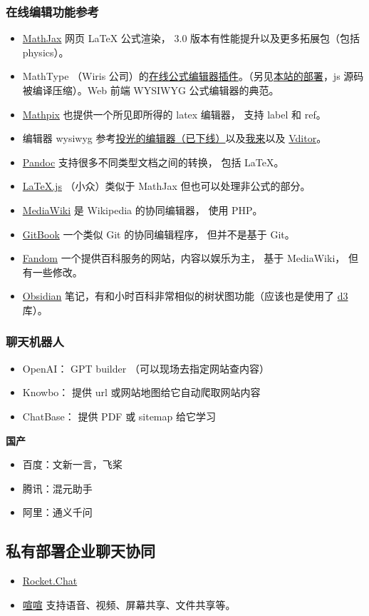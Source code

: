 \subsubsection{在线编辑功能参考}
\begin{itemize}
\item \href{https://www.mathjax.org}{MathJax} 网页 LaTeX 公式渲染， 3.0 版本有性能提升以及更多拓展包（包括 physics）。
\item MathType （Wiris 公司）的\href{https://demo.wiris.com/mathtype/en/developers.php}{在线公式编辑器插件}。（另见\href{https://wuli.wiki/apps/mathtype.html}{本站的部署}，js 源码被编译压缩）。Web 前端 WYSIWYG 公式编辑器的典范。
\item \href{https://mathpix.com/ocr?gclid=CjwKCAiAy_CcBhBeEiwAcoMRHKnSPGjROmFGBj5R_Ev3hke7lG7xNIzKDHv5FgkMFq62aXRpISt_LhoC47YQAvD_BwE}{Mathpix} 也提供一个所见即所得的 latex 编辑器， 支持 label 和 ref。
\item 编辑器 wysiwyg 参考\href{https://editoe.com}{投光的编辑器（已下线）}以及\href{https://www.wolai.com}{我来}以及 \href{https://github.com/Vanessa219/vditor}{Vditor}。
\item \href{https://pandoc.org/}{Pandoc} 支持很多不同类型文档之间的转换， 包括 LaTeX。
\item \href{https://github.com/michael-brade/LaTeX.js}{LaTeX.js} （小众）类似于 MathJax 但也可以处理非公式的部分。
\item \href{https://www.mediawiki.org/wiki/MediaWiki}{MediaWiki} 是 Wikipedia 的协同编辑器， 使用 PHP。
\item \href{https://www.gitbook.com/}{GitBook} 一个类似 Git 的协同编辑程序， 但并不是基于 Git。
\item \href{https://www.fandom.com/}{Fandom} 一个提供百科服务的网站，内容以娱乐为主， 基于 MediaWiki， 但有一些修改。
\item \href{https://obsidian.md/}{Obsidian} 笔记，有和小时百科非常相似的树状图功能（应该也是使用了 \href{https://d3js.org/}{d3} 库）。
\end{itemize}

\subsubsection{聊天机器人}
\begin{itemize}
\item OpenAI： GPT builder （可以现场去指定网站查内容）
\item Knowbo： 提供 url 或网站地图给它自动爬取网站内容
\item ChatBase： 提供 PDF 或 sitemap 给它学习
\end{itemize}

\textbf{国产}
\begin{itemize}
\item 百度：文新一言，飞桨
\item 腾讯：混元助手
\item 阿里：通义千问
\end{itemize}

\subsection{私有部署企业聊天协同}
\begin{itemize}
\item \href{https://www.rocket.chat/}{Rocket.Chat}
\item \href{https://xuanim.com/}{喧喧} 支持语音、视频、屏幕共享、文件共享等。
\end{itemize}


